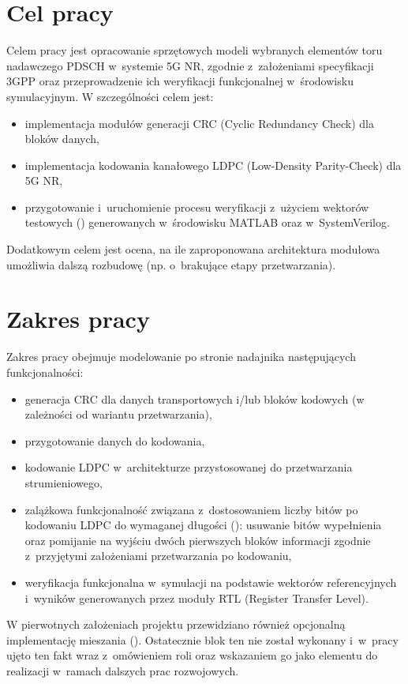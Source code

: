 \section{Cel pracy}
\label{sec:wstep_cel}
Celem pracy jest opracowanie sprzętowych modeli wybranych elementów toru nadawczego PDSCH w~systemie 5G NR, zgodnie z~założeniami specyfikacji 3GPP oraz przeprowadzenie ich weryfikacji funkcjonalnej w~środowisku symulacyjnym. W szczególności celem jest:
\begin{itemize}
    \item implementacja modułów generacji CRC (Cyclic Redundancy Check) dla bloków danych,
    \item implementacja kodowania kanałowego LDPC (Low-Density Parity-Check) dla 5G NR,
    \item przygotowanie i~uruchomienie procesu weryfikacji z~użyciem wektorów testowych () generowanych w~środowisku MATLAB oraz  w~SystemVerilog.
\end{itemize}
Dodatkowym celem jest ocena, na ile zaproponowana architektura modułowa umożliwia dalszą rozbudowę (np. o~brakujące etapy przetwarzania).

\section{Zakres pracy}
\label{sec:wstep_zakres}
Zakres pracy obejmuje modelowanie po stronie nadajnika następujących funkcjonalności:
\begin{itemize}
    \item generacja CRC dla danych transportowych i/lub bloków kodowych (w zależności od wariantu przetwarzania),
    \item przygotowanie danych do kodowania,
    \item kodowanie LDPC w~architekturze przystosowanej do przetwarzania strumieniowego,
    \item zalążkowa funkcjonalność związana z~dostosowaniem liczby bitów po kodowaniu LDPC do wymaganej długości (): usuwanie bitów wypełnienia oraz pomijanie na wyjściu dwóch pierwszych bloków informacji zgodnie z~przyjętymi założeniami przetwarzania po kodowaniu,
    \item weryfikacja funkcjonalna w~symulacji na podstawie wektorów referencyjnych i~wyników generowanych przez moduły RTL (Register Transfer Level).
\end{itemize}

W pierwotnych założeniach projektu przewidziano również opcjonalną implementację mieszania (). Ostatecznie blok ten nie został wykonany i~w~pracy ujęto ten fakt wraz z~omówieniem roli  oraz wskazaniem go jako elementu do realizacji w~ramach dalszych prac rozwojowych.

